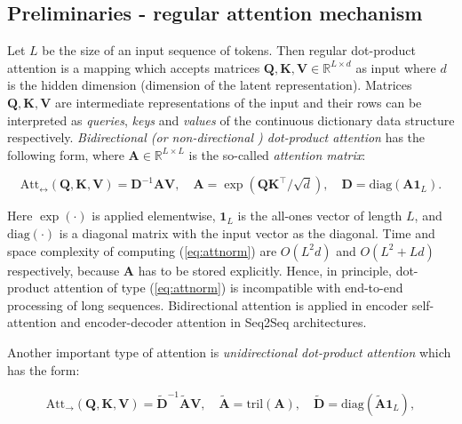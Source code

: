 \subsection{Preliminaries - regular attention mechanism}

Let $L$ be the size of an input sequence of tokens. Then regular dot-product attention \citep{transformer} is a mapping which accepts matrices $\mathbf{Q}, \mathbf{K}, \mathbf{V} \in \mathbb{R}^{L \times d}$ as input where $d$ is the hidden dimension (dimension of the latent representation). Matrices $\mathbf{Q}, \mathbf{K}, \mathbf{V}$ are intermediate representations of the input and their rows can be interpreted as \textit{queries}, \textit{keys} and \textit{values} of the continuous dictionary data structure respectively. \textit{Bidirectional (or non-directional \citep{bert}) dot-product attention} has the following form, where  $\mathbf{A} \in \mathbb{R}^{L \times L}$ is the so-called \textit{attention matrix}:

\begin{equation}
\label{eq:attnorm}
    \mathrm{Att}_\leftrightarrow (\mathbf{Q}, \mathbf{K}, \mathbf{V}) = \mathbf{D}^{-1} \mathbf{A} \mathbf{V}, \quad 
    \mathbf{A} = \exp ( \mathbf{Q} \mathbf{K}^\top / \sqrt{d}), \quad \mathbf{D} = \mathrm{diag} ( \mathbf{A} \mathbf{1}_L ). 
\end{equation}

    

Here $\exp (\cdot)$ is applied elementwise, $\mathbf{1}_L$ is the all-ones vector of length $L$, and $\mathrm{diag} (\cdot)$ is a diagonal matrix with the input vector as the diagonal. Time and space complexity of computing (\ref{eq:attnorm}) are $O(L^2 d)$ and $O(L^{2}+Ld)$ respectively, because $\mathbf{A}$ has to be stored explicitly. Hence, in principle, dot-product attention of type (\ref{eq:attnorm}) is incompatible with end-to-end processing of long sequences. Bidirectional attention is applied in encoder self-attention and encoder-decoder attention in Seq2Seq architectures.

Another important type of attention is \textit{unidirectional dot-product attention} which has the form:

\begin{equation}
    \mathrm{Att}_\to (\mathbf{Q}, \mathbf{K}, \mathbf{V}) = \widetilde{\mathbf{D}}^{-1} \widetilde{\mathbf{A}} \mathbf{V}, \quad 
    \widetilde{\mathbf{A}} = \mathrm{tril} (\mathbf{A}), \quad \widetilde{\mathbf{D}} = \mathrm{diag} ( \widetilde{\mathbf{A}} \mathbf{1}_L ) , \label{eq:uattnorm}
\end{equation}

